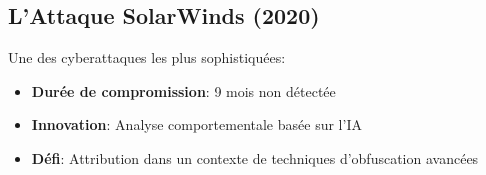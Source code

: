 \subsection{L'Attaque SolarWinds (2020)}
Une des cyberattaques les plus sophistiquées:

\begin{itemize}
\item \textbf{Durée de compromission}: 9 mois non détectée
\item \textbf{Innovation}: Analyse comportementale basée sur l'IA
\item \textbf{Défi}: Attribution dans un contexte de techniques d'obfuscation avancées
\end{itemize}
